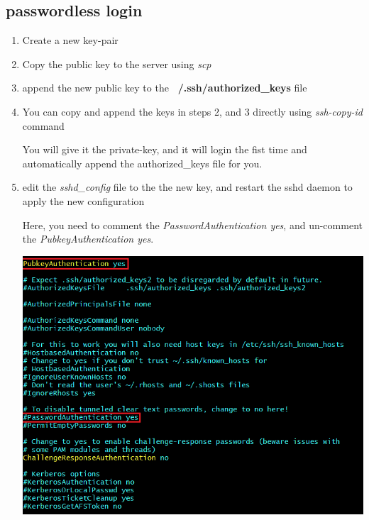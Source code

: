 \documentclass{article}
\begin{document}
\subsection{passwordless login}
\begin{enumerate}
  \item Create a new key-pair
  

  \item Copy the public key to the server using \textit{scp}
  

  \item append the new public key to the \textbf{~/.ssh/authorized\_keys} file
  

  \item You can copy and append the keys in steps 2, and 3 directly using \textit{ssh-copy-id} command
  
  You will give it the private-key, and it will login the fist time and automatically append the authorized\_keys file for you. 
  


  \item edit the \textit{sshd\_config} file to the the new key, and restart the sshd daemon to apply the new configuration
  
  
  Here, you need to comment the \textit{PasswordAuthentication yes}, and un-comment the \textit{PubkeyAuthentication yes}.
  \begin{center}
    \includegraphics[scale=0.75]{resources/ssh/img/sshd_config.PNG}
  \end{center}


\end{enumerate}
\end{document}
